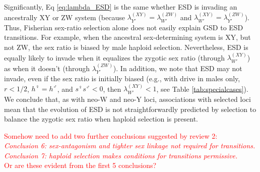 \documentclass[10pt,letterpaper]{article}
\begin{document}

Significantly, Eq \eqref{eq:lambda_ESD} is the same whether ESD is invading an ancestrally XY or ZW system (because $\lambda_{Y'}^{(XY)} = \lambda_{W'}^{(ZW)}$ and $\lambda_{W'}^{(XY)} = \lambda_{Y'}^{(ZW)}$).
Thus, Fisherian sex-ratio selection alone does not easily explain GSD to ESD transitions.
For example, when the ancestral sex-determining system is XY, but not ZW, the sex ratio is biased by male haploid selection.
Nevertheless, ESD is equally likely to invade when it equalizes the zygotic sex ratio (through $\lambda_{W'}^{(XY)}$) as when it doesn't (through $\lambda_{Y'}^{(ZW)}$). 
In addition, we note that ESD may not invade, even if the sex ratio is initially biased (e.g., with drive in males only, $r<1/2$, $h^\female=h^\male$, and $s^\female s^\male<0$, then $\lambda_{W'}^{(XY)}<1$, see Table \ref{tab:specialcases}). 
We conclude that, as with neo-W and neo-Y loci, associations with selected loci mean that the evolution of ESD is not straightforwardly predicted by selection to balance the zygotic sex ratio when haploid selection is present. 

\textcolor{red}{
Somehow need to add two further conclusions suggested by review 2:
\vspace{0.5cm}
\\
\noindent\textit{Conclusion 6: sex-antagonism and tighter sex linkage not required for transitions.}
\vspace{0.5cm}
\\
\noindent\textit{Conclusion 7: haploid selection makes conditions for transitions permissive.}
\vspace{0.5cm}
\\
\noindent Or are these evident from the first 5 conclusions?
}
\end{document}
